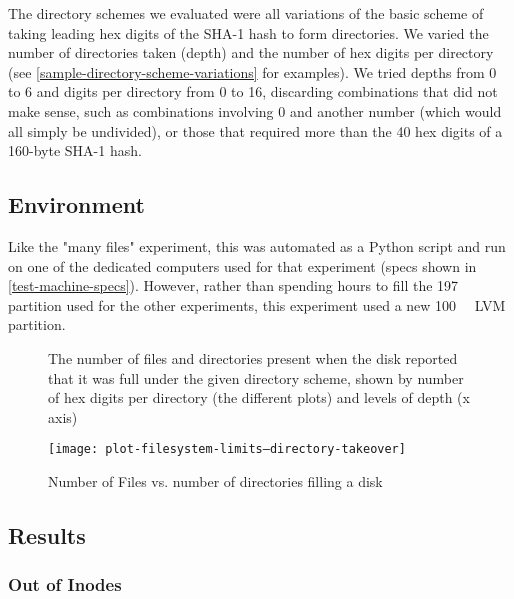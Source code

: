 The directory schemes we evaluated were all variations of the basic scheme of
taking leading hex digits of the SHA-1 hash to form directories. We varied the
number of directories taken (depth) and the number of hex digits per directory
(see \autoref{sample-directory-scheme-variations} for examples). We tried depths
from \num{0} to \num{6} and digits per directory from \num{0} to \num{16},
discarding combinations that did not make sense, such as combinations involving
\num{0} and another number (which would all simply be undivided), or those that
required more than the \num{40} hex digits of a \num{160}-byte SHA-1 hash.

\subsection{Environment}

Like the "many files" experiment, this was automated as a Python script and run
on one of the dedicated computers used for that experiment (specs shown in
\autoref{test-machine-specs}). However, rather than spending hours to fill the
\SI{197}{\gibi\byte} partition used for the other experiments, this experiment
used a new \SI{100}{\mebi\byte} LVM partition.


\begin{figure}[b!]
        \caption{Number of Files vs. number of directories filling a disk}
        \label{fig:plot-filesystem-limits--directory-takeover}
        \centering

        The number of files and directories present when the disk reported that it
        was full under the given directory scheme, shown by number of hex digits per
        directory (the different plots) and levels of depth (x axis)

        \texttt{[image: plot-filesystem-limits--directory-takeover]}
\end{figure}

\cleardoublepage
\subsection{Results}
\label{object-dir-layout-results}

\subsubsection{Out of Inodes}

